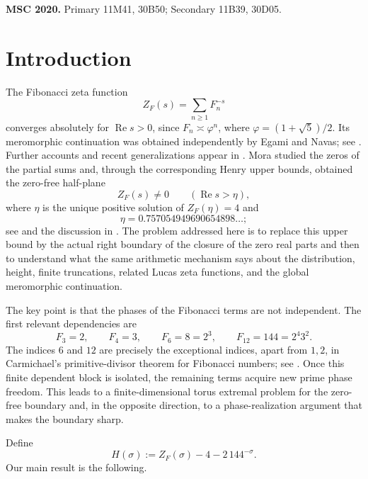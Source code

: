 \documentclass[11pt]{article}
\theoremstyle{remark}
\newcommand{\ZF}{Z_F}
\newcommand{\Ree}{\operatorname{Re}}
\begin{document}
\noindent\textbf{MSC 2020.} Primary 11M41, 30B50; Secondary 11B39, 30D05.

\section{Introduction}

The Fibonacci zeta function
\[
\ZF(s)=\sum_{n\ge1}F_n^{-s}
\]
converges absolutely for $\Ree s>0$, since $F_n\asymp \varphi^n$, where $\varphi=(1+\sqrt5)/2$.  Its meromorphic continuation was obtained independently by Egami and Navas; see \cite{Egami1999,Navas2001}.  Further accounts and recent generalizations appear in \cite{Murty2013,AssafKuanLowryDudaWalker2024}.  Mora studied the zeros of the partial sums and, through the corresponding Henry upper bounds, obtained the zero-free half-plane
\[
\ZF(s)\neq0\qquad (\Ree s>\eta),
\]
where $\eta$ is the unique positive solution of $\ZF(\eta)=4$ and
\[
\eta=0.757054949690654898\ldots;
\]
see \cite{Mora2023} and the discussion in \cite{MoraNavasVarona2025}.  The problem addressed here is to replace this upper bound by the actual right boundary of the closure of the zero real parts and then to understand what the same arithmetic mechanism says about the distribution, height, finite truncations, related Lucas zeta functions, and the global meromorphic continuation.

The key point is that the phases of the Fibonacci terms are not independent.  The first relevant dependencies are
\[
F_3=2,\qquad F_4=3,\qquad F_6=8=2^3,\qquad F_{12}=144=2^4 3^2.
\]
The indices $6$ and $12$ are precisely the exceptional indices, apart from $1,2$, in Carmichael's primitive-divisor theorem for Fibonacci numbers; see \cite{Yabuta2001}.  Once this finite dependent block is isolated, the remaining terms acquire new prime phase freedom.  This leads to a finite-dimensional torus extremal problem for the zero-free boundary and, in the opposite direction, to a phase-realization argument that makes the boundary sharp.

Define
\begin{equation}\label{eq:sigma-def}
H(\sigma):=\ZF(\sigma)-4-2\,144^{-\sigma}.
\end{equation}
Our main result is the following.
\end{document}
